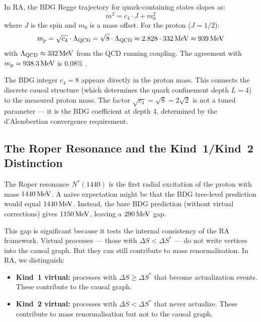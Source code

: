 \documentclass[12pt,a4paper]{article}
\begin{document}
In RA, the BDG Regge trajectory for quark-containing states slopes as:
\begin{equation}
  m^2 = c_4\cdot J + m_0^2
  \label{eq:regge}
\end{equation}
where $J$ is the spin and $m_0$ is a mass offset.  For the proton ($J=1/2$):
\begin{equation}
  m_p = \sqrt{c_4}\cdot\Lambda_{\rm QCD} = \sqrt{8}\cdot\Lambda_{\rm QCD}\approx2.828\cdot332\,{\rm MeV}\approx939\,{\rm MeV}
  \label{eq:proton_mass}
\end{equation}
with $\Lambda_{\rm QCD}\approx332\,{\rm MeV}$ from the QCD running coupling.  The agreement with $m_p=938.3\,{\rm MeV}$ is $0.08\%$ \statusCV.

The BDG integer $c_4=8$ appears directly in the proton mass.  This connects the discrete causal structure (which determines the quark confinement depth $L=4$) to the measured proton mass.  The factor $\sqrt{c_4}=\sqrt{8}=2\sqrt{2}$ is not a tuned parameter --- it is the BDG coefficient at depth 4, determined by the d'Alembertian convergence requirement.

\subsection{The Roper Resonance and the Kind~1/Kind~2 Distinction}

The Roper resonance $N^*(1440)$ is the first radial excitation of the proton with mass $1440\,{\rm MeV}$.  A naive expectation might be that the BDG tree-level prediction would equal $1440\,{\rm MeV}$.  Instead, the bare BDG prediction (without virtual corrections) gives $1150\,{\rm MeV}$, leaving a $290\,{\rm MeV}$ gap.

This gap is significant because it tests the internal consistency of the RA framework.  Virtual processes --- those with $\Delta S<\Delta S^*$ --- do not write vertices into the causal graph.  But they can still contribute to mass renormalisation.  In RA, we distinguish:
\begin{itemize}
  \item \textbf{Kind~1 virtual:} processes with $\Delta S\geq\Delta S^*$ that become actualization events.  These contribute to the causal graph.
  \item \textbf{Kind~2 virtual:} processes with $\Delta S<\Delta S^*$ that never actualize.  These contribute to mass renormalisation but not to the causal graph.
\end{itemize}
\end{document}
